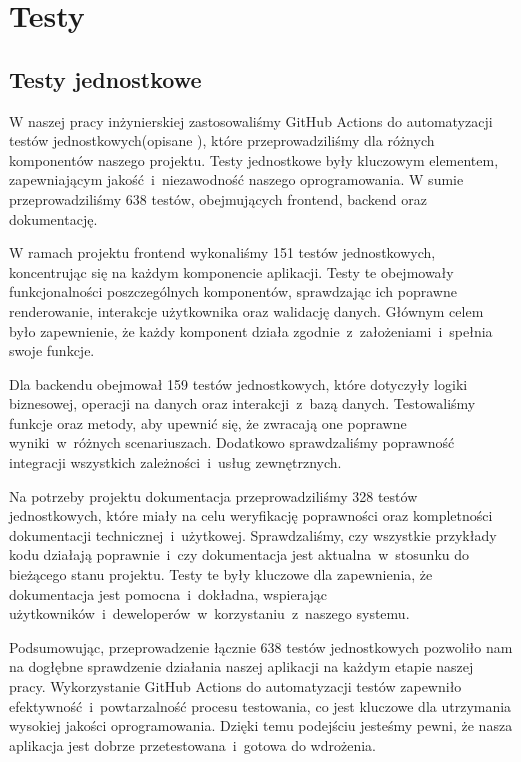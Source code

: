 
\chapter{Testy}
\label{ch:testy}

\section{Testy jednostkowe}
\label{sec:testy-jednostkowe}
W naszej pracy inżynierskiej zastosowaliśmy GitHub Actions do automatyzacji testów jednostkowych(opisane \pageref{sec:github-actions} ), które przeprowadziliśmy dla różnych komponentów naszego projektu.
Testy jednostkowe były kluczowym elementem, zapewniającym jakość~i~niezawodność naszego oprogramowania. 
W sumie przeprowadziliśmy 638 testów, obejmujących frontend, backend oraz dokumentację.\newline

\indent W ramach projektu frontend wykonaliśmy 151 testów jednostkowych, koncentrując się na każdym komponencie aplikacji. Testy te obejmowały funkcjonalności poszczególnych 
komponentów, sprawdzając ich poprawne renderowanie, interakcje użytkownika oraz walidację danych. Głównym celem było zapewnienie, że każdy komponent działa zgodnie~z~założeniami~i~spełnia swoje funkcje.\newline

\indent Dla backendu obejmował 159 testów jednostkowych, które dotyczyły logiki biznesowej, operacji na danych oraz interakcji~z~bazą danych. 
Testowaliśmy funkcje oraz metody, aby upewnić się, że zwracają one poprawne wyniki~w~różnych scenariuszach. Dodatkowo sprawdzaliśmy poprawność integracji wszystkich zależności~i~usług zewnętrznych.\newline

\indent Na potrzeby projektu dokumentacja przeprowadziliśmy 328 testów jednostkowych, które miały na celu weryfikację poprawności oraz kompletności dokumentacji technicznej~i~użytkowej.
 Sprawdzaliśmy, czy wszystkie przykłady kodu działają poprawnie~i~czy dokumentacja jest aktualna~w~stosunku do bieżącego stanu projektu. Testy te były kluczowe dla zapewnienia, że dokumentacja 
 jest pomocna~i~dokładna, wspierając użytkowników~i~deweloperów~w~korzystaniu~z~naszego systemu.\newline

 \indent Podsumowując, przeprowadzenie łącznie 638 testów jednostkowych pozwoliło nam na dogłębne sprawdzenie działania naszej aplikacji na każdym etapie naszej pracy. 
Wykorzystanie GitHub Actions do automatyzacji testów zapewniło efektywność~i~powtarzalność procesu testowania, co jest kluczowe dla utrzymania wysokiej jakości oprogramowania. 
Dzięki temu podejściu jesteśmy pewni, że nasza aplikacja jest dobrze przetestowana~i~gotowa do wdrożenia.\newline

